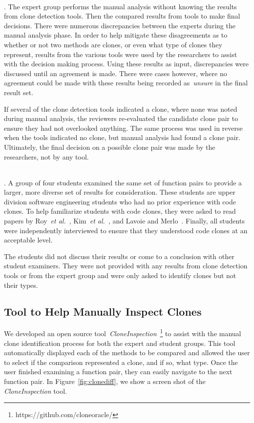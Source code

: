 \documentclass{sig-alternate}
\begin{document}
\
\\
. The expert group performs the manual analysis without knowing the results from clone detection tools. Then the compared results from tools to make final decisions. There were numerous discrepancies between the experts during the manual analysis phase. In order to help mitigate these disagreements as to whether or not two methods are clones, or even what type of clones they represent, results from the various tools were used by the researchers to assist with the decision making process. Using these results as input, discrepancies were discussed until an agreement is made. There were cases however, where no agreement could be made with these results being recorded as~\emph{unsure} in the final result set.

If several of the clone detection tools indicated a clone, where none was noted during manual analysis, the reviewers re-evaluated the candidate clone pair to ensure they had not overlooked anything. The same process was used in reverse when the tools indicated no clone, but manual analysis had found a clone pair. Ultimately, the final decision on a possible clone pair was made by the researchers, not by any tool.

\
\\
. A group of four students examined the same set of function pairs to provide a larger, more diverse set of results for consideration. These students are upper division software engineering students who had no prior experience with code clones. To help familiarize students with code clones, they were asked to read papers by Roy~\emph{et al.}~\cite{Roy:2009:CEC:1530898.1531101}, Kim~\emph{et al.}~\cite{Kim:2011:MMC:1985793.1985835}, and Lavoie and Merlo~\cite{Lavoie:2011:ATC:1985404.1985411}. Finally, all students were independently interviewed to ensure that they understood code clones at an acceptable level.

The students did not discuss their results or come to a conclusion with other student examiners. They were not provided with any results from clone detection tools or from the expert group and were only asked to identify clones but not their types.

\subsection{Tool to Help Manually Inspect Clones}
We developed an open source tool~\emph{CloneInspection}~\footnote{https://github.com/cloneoracle/} to assist with the manual clone identification process for both the expert and student groups. This tool automatically displayed each of the methods to be compared and allowed the user to select if the comparison represented a clone, and if so, what type. Once the user finished examining a function pair, they can easily navigate to the next function pair. In Figure~\ref{fig:clonediff}, we show a screen shot of the {\it CloneInspection} tool.
\end{document}
